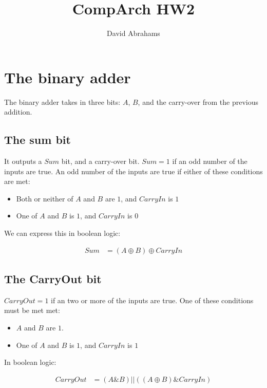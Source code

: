 \documentclass[]{article}
\title{CompArch HW2}
\author{David Abrahams}
\begin{document}
\maketitle

\section{The binary adder}

The binary adder takes in three bits: $A$, $B$, and the carry-over from the previous addition.

\subsection{The sum bit}

It outputs a $Sum$ bit, and a carry-over bit. $Sum=1$ if an odd number of the inputs are true. An odd number of the inputs are true if either of these conditions are met:
	
\begin{itemize}
			
	\item Both or neither of $A$ and $B$ are $1$, and $CarryIn$ is $1$
	\item One of $A$ and $B$ is $1$, and $CarryIn$ is $0$
	      		      
\end{itemize}
	
We can express this in boolean logic:
	
\begin{align}
	Sum & = \left(A \oplus B\right) \oplus CarryIn 
\end{align}
	
\subsection{The CarryOut bit}

$CarryOut=1$ if an two or more of the inputs are true. One of these conditions must be met met:
	
		
\begin{itemize}
			
	\item $A$ and $B$ are $1$.
	\item One of $A$ and $B$ is $1$, and $CarryIn$ is $1$
	           
\end{itemize}
	
In boolean logic:
	
\begin{align}
	CarryOut & = \left(A \& B\right) || \left(\left(A \oplus B\right) \& CarryIn\right) 
\end{align}
	
\end{document}
